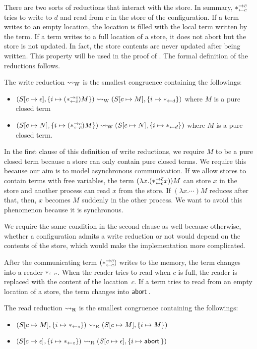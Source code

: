 There are two sorts of reductions that interact with the store.
In summary, $\ast^{\rightarrow {\bar{c}}}_{\leftarrow{c}}$ tries to write to $d$ and read from
$c$ in the store of the configuration.
If a term writes to an empty location, the location is filled with the
local term written by the term.
 If a term writes to a full location of
a store, it does not abort but the store is not updated.  In fact, the
store contents are never updated after being written.
This property will be used in the proof of .
The formal definition of the reductions follows.
\begin{definition}
 The write reduction $\rightsquigarrow_{\mathrm W}$ is the smallest congruence
 containing the followings:
 \begin{itemize}
  \item $({S}{[c\mapsto \epsilon]},{\{i\mapsto {(\ast^{\rightarrow {c}}_{\leftarrow{\bar{c}}})M}\}}) \rightsquigarrow_{\mathrm W}
	({S}{[c\mapsto M]},{\{i\mapsto {\ast_{\leftarrow{d}}}\}})
	$ where $M$ is a pure closed term
  \item $({S}{[c\mapsto N]},{\{i\mapsto {(\ast^{\rightarrow {c}}_{\leftarrow{\bar{c}}}) M}\}}) \rightsquigarrow_{\mathrm W}
	({S}{[c\mapsto	N]},{\{i\mapsto {\ast_{\leftarrow{d}}}\}})$ where $M$ is a pure
	closed term.
 \end{itemize}
\end{definition}
In the first clause of this definition of write reductions, we require
$M$ to be a pure closed
term because a store can only contain pure closed terms.
We require this because our aim is to model asynchronous communication.
If we allow stores to contain terms with free variables,
the term $(\lambda x. (\ast^{\rightarrow {\bar{c}}}_{\leftarrow{c}} x)) M$ can store $x$ in the store and
another process can read $x$ from the store.
If $(\lambda x.\cdots)M$ reduces after that,
then, $x$ becomes $M$ suddenly in the other process.
We want to avoid this phenomenon because it is synchronous.

We require the same condition in the second clause as well because
otherwise, whether a configuration admits a write reduction or not
would depend on the contents of the store, which would make the
implementation more complicated.

After the communicating term $(\ast^{\rightarrow {\bar{c}}}_{\leftarrow{c}})$ writes to the memory,
the term changes into a reader $\ast_{\leftarrow{c}}$.  When the reader tries to
read when $c$ is full, the reader is replaced with the content of the
location~$c$.
If a term tries to read from an empty location of a store,
the term changes into $\mathsf{abort\,}$.
\begin{definition}
 \label{read}
 The read reduction $\rightsquigarrow_{\mathrm R}$ is the smallest congruence
 containing the
 followings:
\begin{itemize}
   \item $({S}{[c\mapsto M]},{\{i\mapsto {\ast_{\leftarrow{c}}}\}})\rightsquigarrow_{\mathrm R} 
      ({S}{[c\mapsto M]},{\{i\mapsto {M}\}})$
   \item $({S}{[c\mapsto \epsilon]},{\{i\mapsto {\ast_{\leftarrow{c}}}\}})
       \rightsquigarrow_{\mathrm R} ({S}{[c\mapsto \epsilon]},{\{i\mapsto {\mathsf{abort\,}}\}})$
\end{itemize}
\end{definition}

